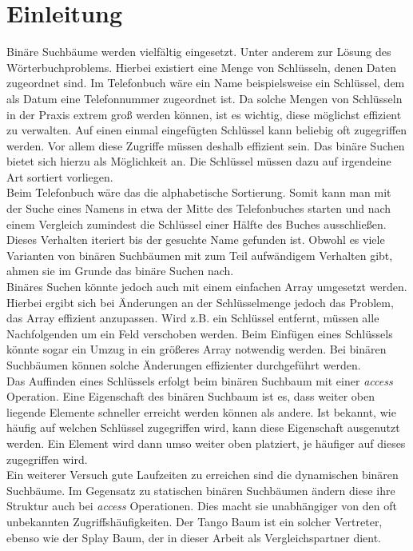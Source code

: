 \documentclass[a4paper,12pt]{article}
\begin{document}
\newpage
\section{Einleitung}
Binäre Suchbäume werden vielfältig eingesetzt. Unter anderem zur Lösung des Wörterbuchproblems. Hierbei existiert eine Menge von Schlüsseln, denen Daten zugeordnet sind. Im Telefonbuch wäre ein Name beispielsweise ein Schlüssel, dem als Datum eine Telefonnummer zugeordnet ist. Da solche Mengen von Schlüsseln in der Praxis extrem groß werden können, ist es wichtig, diese möglichst effizient zu verwalten. Auf einen einmal eingefügten Schlüssel kann beliebig oft zugegriffen werden. Vor allem diese Zugriffe müssen deshalb effizient sein. Das binäre Suchen bietet sich hierzu als Möglichkeit an. Die Schlüssel müssen dazu auf irgendeine Art sortiert vorliegen.\\ Beim Telefonbuch wäre das die alphabetische Sortierung. Somit kann man mit der Suche eines Namens in etwa der Mitte des Telefonbuches starten und nach einem Vergleich zumindest die Schlüssel einer Hälfte des Buches ausschließen. Dieses Verhalten iteriert bis der gesuchte Name gefunden ist. Obwohl es viele Varianten von binären Suchbäumen mit zum Teil aufwändigem Verhalten gibt, ahmen sie im Grunde das binäre Suchen nach.\\
Binäres Suchen könnte jedoch auch mit einem einfachen Array umgesetzt werden. Hierbei ergibt sich bei Änderungen an der Schlüsselmenge jedoch das Problem, das Array effizient anzupassen. Wird z.B. ein Schlüssel entfernt, müssen alle Nachfolgenden um ein Feld verschoben werden. Beim Einfügen eines Schlüssels könnte sogar ein Umzug in ein größeres Array notwendig werden. Bei binären Suchbäumen können solche Änderungen effizienter durchgeführt werden.\\ 
Das Auffinden eines Schlüssels erfolgt beim binären Suchbaum  mit einer \textit{access} Operation.  Eine Eigenschaft des binären Suchbaum ist es, dass weiter oben liegende Elemente schneller erreicht werden können als andere. Ist bekannt, wie häufig auf welchen Schlüssel zugegriffen wird, kann diese Eigenschaft ausgenutzt werden. Ein Element wird dann umso weiter oben platziert, je häufiger auf dieses zugegriffen wird. \\
Ein weiterer Versuch gute Laufzeiten zu erreichen sind die dynamischen binären Suchbäume. Im Gegensatz zu statischen binären Suchbäumen ändern diese ihre Struktur auch bei \textit{access} Operationen. Dies macht sie unabhängiger von den oft unbekannten Zugriffshäufigkeiten. Der Tango Baum ist ein solcher Vertreter, ebenso wie der Splay Baum, der in dieser Arbeit als Vergleichspartner dient.
\end{document}
